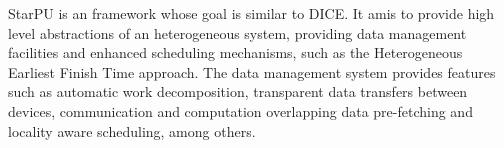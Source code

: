 

StarPU is an framework whose goal is similar to DICE. It amis to provide high level abstractions of an heterogeneous system, providing data management facilities and enhanced scheduling mechanisms, such as the Heterogeneous Earliest Finish Time approach. The data management system provides features such as automatic work decomposition, transparent data transfers between devices, communication and computation overlapping data pre-fetching and locality aware scheduling, among others.